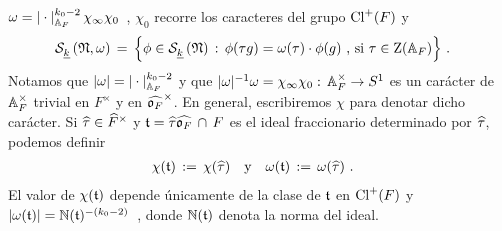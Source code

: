 \begin{math}
	\omega=|\cdot|_{\adeles{F}}^{k_{0}-2}\,\chi_{\infty}\chi_{0}
\end{math}~, $\chi_{0}$ recorre los caracteres del grupo $\pClass{F}$ y
\begin{align*}
	\spitzH{k}{\frak{N},\omega} & \,=\,\Big\{\phi\in\spitzH{k}{\frak{N}}
		\,:\,\phi(\tau g)=\omega(\tau)\cdot\phi(g)
			\text{ , si }\tau\in\centre(\adeles{F})
		\Big\}
	\text{ .}
\end{align*}
%
Notamos que
\begin{math}
	|\omega|=|\cdot|_{\adeles{F}}^{k_{0}-2}
\end{math} y que
\begin{math}
	|\omega|^{-1}\omega=\chi_{\infty}\chi_{0}:\,
		\ideles{F}\rightarrow S^1
\end{math} es un car\'{a}cter de $\ideles{F}$ trivial en $F^{\times}$ y en
$\Idfin{\oka{F}}$. En general, escribiremos $\chi$ para denotar dicho
car\'{a}cter. Si $\hhat{\tau}\in\Idfin{F}$ y
\begin{math}
	\frak{t}=\hhat{\tau}\Adfin{\oka{F}}\,\cap\,F
\end{math} es el ideal fraccionario determinado por $\hhat{\tau}$, podemos
definir
\begin{align*}
	\chi(\frak{t}) \,:=\,\chi(\hhat{\tau})
		& \quad\text{y}\quad\omega(\frak{t})\,:=\,\omega(\hhat{\tau})
	\text{ .}
\end{align*}
%
El valor de $\chi(\frak{t})$ depende \'{u}nicamente de la clase de $\frak{t}$
en $\pClass{F}$ y
\begin{math}
	|\omega(\frak{t})|=\idnorm(\frak{t})^{-(k_{0}-2)}
\end{math}~, donde $\idnorm(\frak{t})$ denota la norma del ideal.
